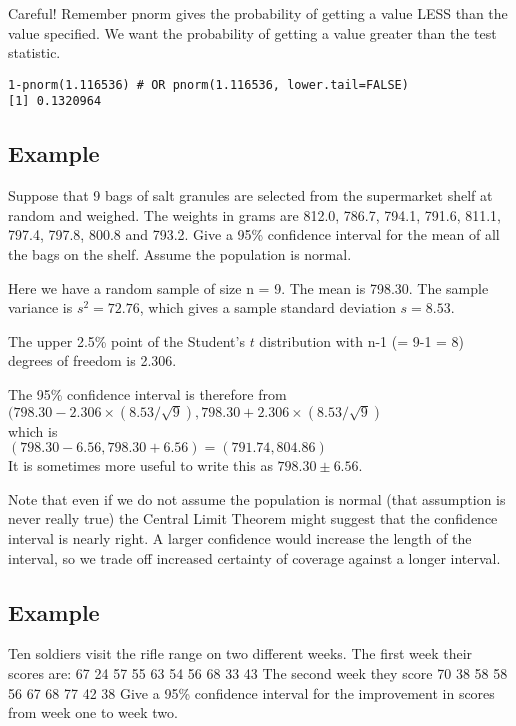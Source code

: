 Careful! Remember pnorm
gives the probability of getting a value LESS than the value specified. We want the probability of getting a value greater than
the test statistic.
\begin{verbatim}
1-pnorm(1.116536) # OR pnorm(1.116536, lower.tail=FALSE)
[1] 0.1320964
\end{verbatim}
\newpage




\subsection{Example}
Suppose that 9 bags of salt granules are selected from the supermarket
shelf at random and weighed. The weights in grams are 812.0, 786.7, 794.1,
791.6, 811.1, 797.4, 797.8, 800.8 and 793.2. Give a 95\% confidence interval for the
mean of all the bags on the shelf. Assume the population is normal.


Here we have a random sample of size n = 9. The mean is 798.30. The sample
variance is $s^2 = 72.76$, which gives a sample standard deviation $s = 8.53$.

The upper 2.5\% point of the Student's $t$ distribution with n-1 (= 9-1 = 8) degrees of freedom is 2.306.

The 95\% confidence interval is therefore from \\
$(798.30 - 2.306 \times (8.53/\sqrt{9}), 798.30 + 2.306 \times (8.53/\sqrt{9})$\\
which is\\
$(798.30 - 6.56, 798.30 + 6.56) = (791.74, 804.86)$\\
It is sometimes more useful to write this as $798.30 \pm 6.56$.

Note that even if we do not assume the population is normal (that assumption is
never really true) the Central Limit Theorem might suggest that the confidence interval
is nearly right. A larger confidence would increase the length of the interval, so we
trade off increased certainty of coverage against a longer interval.

\subsection{Example}
Ten soldiers visit the rifle range on two different weeks. The first
week their scores are:
67 24 57 55 63 54 56 68 33 43
The second week they score
70 38 58 58 56 67 68 77 42 38
Give a 95\% confidence interval for the improvement in scores from week one to
week two.


